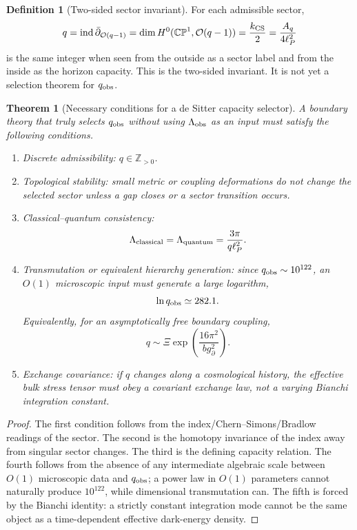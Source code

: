 \documentclass[aps,prd,reprint,nofootinbib,superscriptaddress,floatfix]{revtex4-2}
\numberwithin{equation}{section}
\theoremstyle{definition}
\newtheorem{definition}{Definition}[section]
\theoremstyle{plain}
\newtheorem{theorem}{Theorem}[section]
\newcommand{\CP}{\mathbb{CP}}
\begin{document}
\begin{definition}[Two-sided sector invariant]
For each admissible sector,
\[
q=\operatorname{ind}\bar\partial_{\mathcal O(q-1)}
=\dim H^0(\CP^1,\mathcal O(q-1))
=\frac{k_{\rm CS}}2
=\frac{A_q}{4\ell_P^2}
\]
is the same integer when seen from the outside as a sector label and from the
inside as the horizon capacity.  This is the two-sided invariant.  It is not
yet a selection theorem for \(q_{\rm obs}\).
\end{definition}

\begin{theorem}[Necessary conditions for a de Sitter capacity selector]
A boundary theory that truly selects \(q_{\rm obs}\) without using
\(\Lambda_{\rm obs}\) as an input must satisfy the following conditions.
\begin{enumerate}
\item \emph{Discrete admissibility:} \(q\in\mathbb Z_{>0}\).
\item \emph{Topological stability:} small metric or coupling deformations do
not change the selected sector unless a gap closes or a sector transition
occurs.
\item \emph{Classical--quantum consistency:}
\[
\Lambda_{\rm classical}=\Lambda_{\rm quantum}
=\frac{3\pi}{q\ell_P^2}.
\]
\item \emph{Transmutation or equivalent hierarchy generation:} since
\(q_{\rm obs}\sim10^{122}\), an \(O(1)\) microscopic input must generate a
large logarithm,
\[
\ln q_{\rm obs}\simeq 282.1.
\]
Equivalently, for an asymptotically free boundary coupling,
\[
q\sim
\Xi\exp\!\left(\frac{16\pi^2}{b g_\partial^2}\right).
\]
\item \emph{Exchange covariance:} if \(q\) changes along a cosmological
history, the effective bulk stress tensor must obey a covariant exchange law,
not a varying Bianchi integration constant.
\end{enumerate}
\end{theorem}

\begin{proof}
The first condition follows from the index/Chern--Simons/Bradlow readings of
the sector.  The second is the homotopy invariance of the index away from
singular sector changes.  The third is the defining capacity relation.  The
fourth follows from the absence of any intermediate algebraic scale between
\(O(1)\) microscopic data and \(q_{\rm obs}\); a power law in \(O(1)\)
parameters cannot naturally produce \(10^{122}\), while dimensional
transmutation can.  The fifth is forced by the Bianchi identity: a strictly
constant integration mode cannot be the same object as a time-dependent
effective dark-energy density.
\end{proof}
\end{document}
